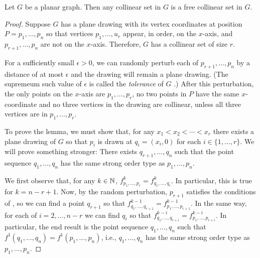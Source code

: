 \documentclass{patmorin}
\begin{document}
\begin{lem}
   Let $G$ be a planar graph.  Then any collinear set in $G$ is a free
   collinear set in $G$.
\end{lem}

\begin{proof}
   Suppose $G$ has a plane drawing with its vertex coordinates at position
   $P=p_1,\ldots,p_n$ so that vertices $p_1,\ldots,u_r$ appear, in order,
   on the $x$-axis, and $p_{r+1},\ldots,p_n$ are not on the $x$-axis.
   Therefore, $G$ has a collinear set of size $r$.

   For a sufficiently small $\epsilon>0$, we can randomly perturb each
   of $p_{r+1},\ldots,p_n$ by a distance of at most $\epsilon$ and the
   drawing will remain a plane drawing. (The supremeum such value of
   $\epsilon$ is called the \emph{tolerance} of $G$ \cite{X}.)  After this
   perturbation, the only points on the $x$-axis are $p_1,\ldots,p_r$,
   no two points in $P$ have the same $x$-coordinate and no three
   vertices in the drawing are collinear, unless all three vertices are
   in $p_1,\ldots,p_r$.

   To prove the lemma, we must show that, for any $x_1<x_2<\cdots<x_r$
   there exists a plane drawing of $G$ so that $p_i$ is drawn
   at $q_i=(x_i,0)$ for each $i\in\{1,\ldots,r\}$.  We will prove
   something stronger: There exists $q_{r+1},\ldots,q_n$ such that the
   point sequence $q_1,\ldots,q_n$ has the same strong order type as
   $p_1,\ldots,p_n$. 

   We first observe that, for any $k\in\mathbb{N}$,
   $f^{k}_{p_1,\ldots,p_r}=f^{k}_{q_1,\ldots,q_r}$.
   In particular, this is true for $k=n-r+1$.  Now, by the
   random perturbation, $p_{r+1}$ satisfies the conditions
   of , so we can find a point $q_{r+1}$ so that
   $f^{k-1}_{q_1,\ldots,q_{r+1}}=f^{k-1}_{p_1,\ldots,p_{r+1}}$.  In the
   same way, for each of $i=2,\ldots,n-r$ we can find $q_i$ so that
   $f^{k-i}_{q_1,\ldots,q_{r+i}} = f^{k-i}_{p_1,\ldots,p_{r+i}}$.
   In particular, the end result is the point sequence $q_1,\ldots,q_n$
   such that $f^{1}(q_1,\ldots,q_n)=f^{1}(p_1,\ldots,p_n)$, i.e.,
   $q_1,\ldots,q_n$ has the same strong order type as $p_1,\ldots,p_n$.
\end{proof}
\end{document}
